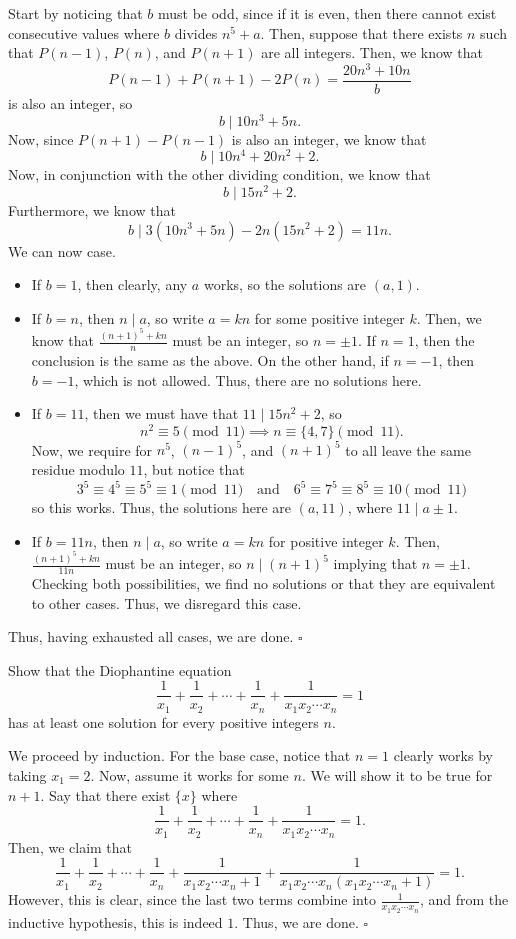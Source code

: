 \documentclass{article}
\begin{document}
Start by noticing that $b$ must be odd, since if it is even, then there cannot exist consecutive values where $b$ divides $n^5+a$. Then, suppose that there exists $n$ such that $P(n-1)$, $P(n)$, and $P(n+1)$ are all integers. Then, we know that \[P(n-1)+P(n+1)-2P(n) = \dfrac{20n^3+10n}{b}\] is also an integer, so \[b \mid 10n^3+5n.\] Now, since $P(n+1)-P(n-1)$ is also an integer, we know that \[b \mid 10 n^4 + 20 n^2 + 2.\] Now, in conjunction with the other dividing condition, we know that \[b \mid 15n^2+2.\] Furthermore, we know that \[b \mid 3(10n^3+5n)-2n(15n^2+2) = 11n.\] We can now case.
\begin{itemize}
\item If $b = 1$, then clearly, any $a$ works, so the solutions are $(a, 1)$.
\item If $b = n$, then $n \mid a$, so write $a = kn$ for some positive integer $k$. Then, we know that $\tfrac{(n+1)^5+kn}{n}$ must be an integer, so $n = \pm 1$. If $n = 1$, then the conclusion is the same as the above. On the other hand, if $n = -1$, then $b = -1$, which is not allowed. Thus, there are no solutions here.
\item If $b = 11$, then we must have that $11 \mid 15n^2+2$, so \[n^2 \equiv 5 \pmod{11} \implies n \equiv \{4, 7\} \pmod{11}.\] Now, we require for $n^5$, $(n-1)^5$, and $(n+1)^5$ to all leave the same residue modulo $11$, but notice that \[3^5 \equiv 4^5 \equiv 5^5 \equiv 1 \pmod{11} \quad \text{and} \quad 6^5\equiv 7^5\equiv 8^5 \equiv 10 \pmod{11}\] so this works. Thus, the solutions here are $(a, 11)$, where $11 \mid a \pm 1$.
\item If $b = 11n$, then $n \mid a$, so write $a = kn$ for positive integer $k$. Then, $\tfrac{(n+1)^5+kn}{11n}$ must be an integer, so $n \mid (n+1)^5$ implying that $n = \pm 1$. Checking both possibilities, we find no solutions or that they are equivalent to other cases. Thus, we disregard this case.
\end{itemize}

Thus, having exhausted all cases, we are done. $\square$

\newpage

\begin{problem}[4.9.10]{}
Show that the Diophantine equation \[\dfrac{1}{x_1}+\dfrac{1}{x_2}+\cdots+\dfrac{1}{x_n}+\dfrac{1}{x_1x_2\cdots x_n} = 1\] has at least one solution for every positive integers $n$.
\end{problem}

We proceed by induction. For the base case, notice that $n = 1$ clearly works by taking $x_1 = 2$. Now, assume it works for some $n$. We will show it to be true for $n+1$. Say that there exist $\{x\}$ where \[\dfrac{1}{x_1}+\dfrac{1}{x_2}+\cdots+\dfrac{1}{x_n}+\dfrac{1}{x_1x_2\cdots x_n} = 1.\] Then, we claim that \[\dfrac{1}{x_1}+\dfrac{1}{x_2}+\cdots+\dfrac{1}{x_n}+\dfrac{1}{x_1x_2\cdots x_n+1}+\dfrac{1}{x_1x_2\cdots x_n(x_1x_2\cdots x_n+1)} = 1.\] However, this is clear, since the last two terms combine into $\tfrac{1}{x_1x_2\cdots x_n}$, and from the inductive hypothesis, this is indeed $1$. Thus, we are done. $\square$
\end{document}
